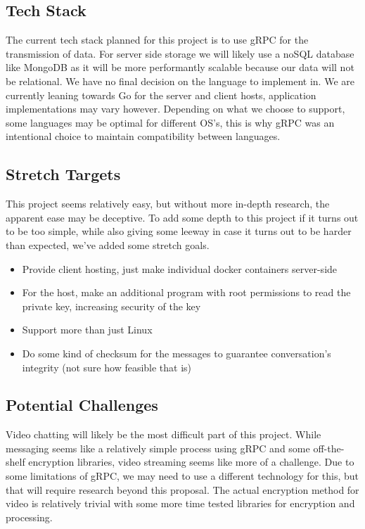 \documentclass[titlepage]{article}
\begin{document}
    \subsection{Tech Stack}

    The current tech stack planned for this project is to use gRPC for the transmission of data.
    For server side storage we will likely use a noSQL database like MongoDB as it will be more performantly scalable because our data will not be relational.
    We have no final decision on the language to implement in.
    We are currently leaning towards Go for the server and client hosts, application implementations may vary however.
    Depending on what we choose to support, some languages may be optimal for different OS's, this is why gRPC was an intentional choice to maintain compatibility between languages.

    \subsection{Stretch Targets}

    This project seems relatively easy, but without more in-depth research, the apparent ease may be deceptive.
    To add some depth to this project if it turns out to be too simple, while also giving some leeway in case it turns out to be harder than expected, we've added some stretch goals.
    \begin{itemize}
        \item Provide client hosting, just make individual docker containers server-side
        \item For the host, make an additional program with root permissions to read the private key, increasing security of the key
        \item Support more than just Linux
        \item Do some kind of checksum for the messages to guarantee conversation's integrity (not sure how feasible that is)
    \end{itemize}

    \subsection{Potential Challenges}

    Video chatting will likely be the most difficult part of this project.
    While messaging seems like a relatively simple process using gRPC and some off-the-shelf encryption libraries, video streaming seems like more of a challenge.
    Due to some limitations of gRPC, we may need to use a different technology for this, but that will require research beyond this proposal.
    The actual encryption method for video is relatively trivial with some more time tested libraries for encryption and processing.
\end{document}
